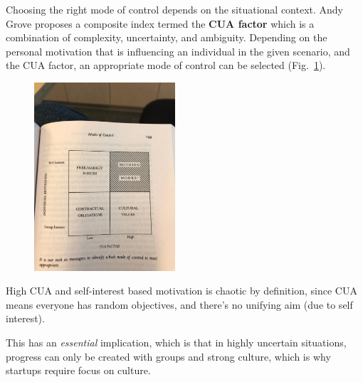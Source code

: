 \documentclass{article}
\begin{document}
Choosing the right mode of control depends on the situational context. Andy Grove proposes a composite index termed the \textbf{CUA factor} which is a combination of complexity, uncertainty, and ambiguity. Depending on the personal motivation that is influencing an individual in the given scenario, and the CUA factor, an appropriate mode of control can be selected (Fig.~\ref{fig:control}).

\begin{figure}[h]
  \centering
  \includegraphics[height=7cm]{control.pdf}
  \caption{\label{fig:control} }
\end{figure}

High CUA and self-interest based motivation is chaotic by definition, since CUA means everyone has random objectives, and there’s no unifying aim (due to self interest).

This has an \textit{essential} implication, which is that in highly uncertain situations, progress can only be created with groups and strong culture, which is why startups require focus on culture.

{}

\end{document}

